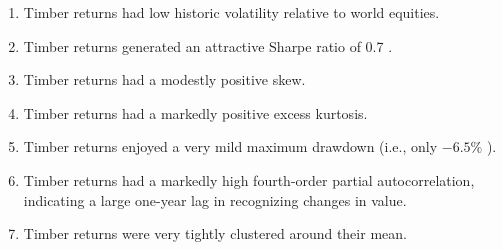 \documentclass[11pt]{article}
\begin{document}
\begin{enumerate}
  \item Timber returns had low historic volatility relative to world equities.

  \item Timber returns generated an attractive Sharpe ratio of 0.7 .

  \item Timber returns had a modestly positive skew.

  \item Timber returns had a markedly positive excess kurtosis.

  \item Timber returns enjoyed a very mild maximum drawdown (i.e., only $-6.5 \%$ ).

  \item Timber returns had a markedly high fourth-order partial autocorrelation, indicating a large one-year lag in recognizing changes in value.

  \item Timber returns were very tightly clustered around their mean.

\end{enumerate}
\end{document}
